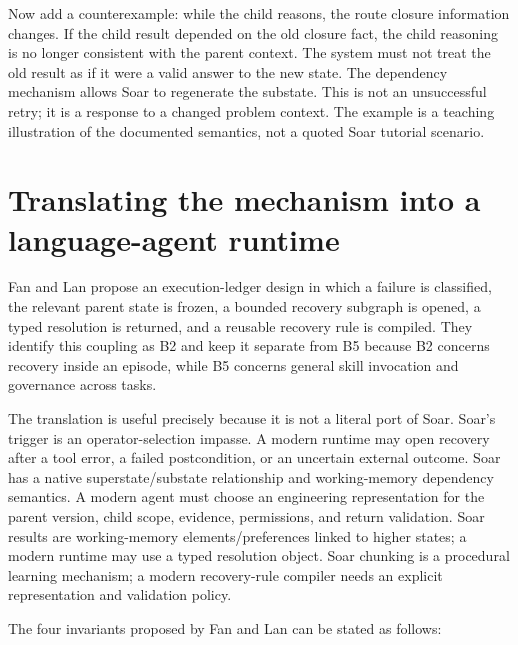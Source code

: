 Now add a counterexample: while the child reasons, the route closure information changes. If the child result depended on the old closure fact, the child reasoning is no longer consistent with the parent context. The system must not treat the old result as if it were a valid answer to the new state. The dependency mechanism allows Soar to regenerate the substate. This is not an unsuccessful retry; it is a response to a changed problem context. The example is a teaching illustration of the documented semantics, not a quoted Soar tutorial scenario.


\section{Translating the mechanism into a language-agent runtime}
\label{sec:ch13-translation}

Fan and Lan propose an execution-ledger design in which a failure is classified, the relevant parent state is frozen, a bounded recovery subgraph is opened, a typed resolution is returned, and a reusable recovery rule is compiled. They identify this coupling as B2 and keep it separate from B5 because B2 concerns recovery inside an episode, while B5 concerns general skill invocation and governance across tasks.

The translation is useful precisely because it is not a literal port of Soar. Soar's trigger is an operator-selection impasse. A modern runtime may open recovery after a tool error, a failed postcondition, or an uncertain external outcome. Soar has a native superstate/substate relationship and working-memory dependency semantics. A modern agent must choose an engineering representation for the parent version, child scope, evidence, permissions, and return validation. Soar results are working-memory elements/preferences linked to higher states; a modern runtime may use a typed resolution object. Soar chunking is a procedural learning mechanism; a modern recovery-rule compiler needs an explicit representation and validation policy.

The four invariants proposed by Fan and Lan can be stated as follows:

